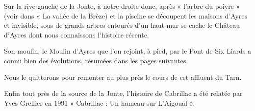\medskip

Sur la rive gauche de la Jonte, à notre droite donc, après « l’arbre du poivre » (voir dans « La vallée
de la Brèze) et la piscine se découpent les maisons d’Ayres et invisible, sous de grands arbres
entourés d’un haut mur se cache le Château d’Ayres dont nous connaissons l’histoire récente.

\medskip

Son moulin, le Moulin d’Ayres que l’on rejoint, à pied, par le Pont de Six Liards a connu bien
des évolutions, résumées dans les pages suivantes.

\medskip

Nous le quitterons pour remonter au plus près le cours de cet affluent du Tarn.

\medskip

Enfin tout près de la source de la Jonte, l’histoire de Cabrillac a été relatée par Yves Grellier
en 1991 « Cabrillac : Un hameau sur L’Aigoual ».

